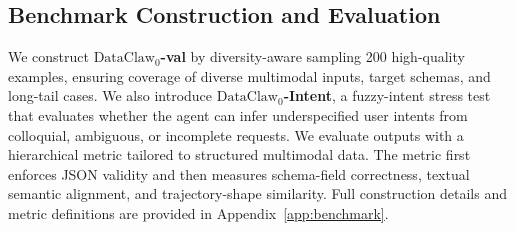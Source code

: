 

\subsection{Benchmark Construction and Evaluation}

We construct \textbf{$\text{DataClaw}_0$-val} by diversity-aware sampling 200 high-quality examples, ensuring coverage of diverse multimodal inputs, target schemas, and long-tail cases. We also introduce \textbf{$\text{DataClaw}_0$-Intent}, a fuzzy-intent stress test that evaluates whether the agent can infer underspecified user intents from colloquial, ambiguous, or incomplete requests.
We evaluate outputs with a hierarchical metric tailored to structured multimodal data. The metric first enforces JSON validity and then measures schema-field correctness, textual semantic alignment, and trajectory-shape similarity. Full construction details and metric definitions are provided in Appendix~\ref{app:benchmark}.

